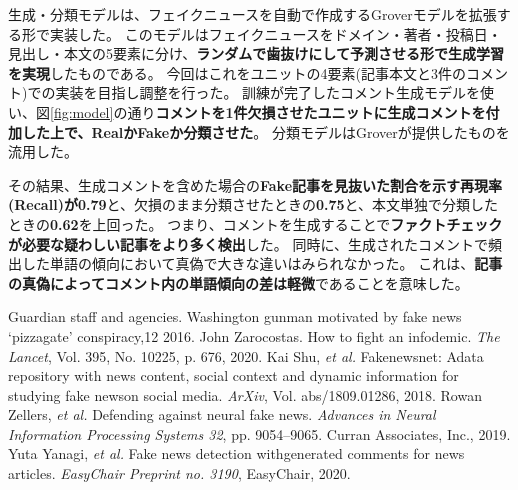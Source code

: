 {	生成・分類モデルは、フェイクニュースを自動で作成するGroverモデル\cite{NIPS2019_9106}を拡張する形で実装した。
	このモデルはフェイクニュースをドメイン・著者・投稿日・見出し・本文の5要素に分け、\textbf{ランダムで歯抜けにして予測させる形で生成学習を実現}したものである。
	今回はこれをユニットの4要素(記事本文と3件のコメント)での実装を目指し調整を行った。
	訓練が完了したコメント生成モデルを使い、図\ref{fig:model}の通り\textbf{コメントを1件欠損させたユニットに生成コメントを付加した上で、RealかFakeか分類させた}。
	分類モデルはGroverが提供したものを流用した。

	その結果、生成コメントを含めた場合の\textbf{Fake記事を見抜いた割合を示す再現率(Recall)が0.79}と、欠損のまま分類させたときの\textbf{0.75}と、本文単独で分類したときの\textbf{0.62}を上回った。
	つまり、コメントを生成することで\textbf{ファクトチェックが必要な疑わしい記事をより多く検出}した\cite{EasyChair:3190}。
	同時に、生成されたコメントで頻出した単語の傾向において真偽で大きな違いはみられなかった。
	これは、\textbf{記事の真偽によってコメント内の単語傾向の差は軽微}であることを意味した。

	{\small 
	\begin{thebibliography}{99}
		 Guardian staff and agencies. Washington gunman motivated by fake news `pizzagate' conspiracy,12 2016.
		 John Zarocostas. How to fight an infodemic. \textit{The Lancet}, Vol. 395, No. 10225, p. 676, 2020.
		 Kai Shu, \textit{et al.} Fakenewsnet: Adata repository with news content, social context and dynamic information for studying fake newson social media. \textit{ArXiv}, Vol. abs/1809.01286, 2018.
		 Rowan Zellers, \textit{et al.} Defending against neural fake news. \textit{Advances in Neural Information Processing Systems 32}, pp. 9054–9065. Curran Associates, Inc., 2019.
		 Yuta Yanagi, \textit{et al.} Fake news detection withgenerated comments for news articles. \textit{EasyChair Preprint no. 3190}, EasyChair, 2020.
	\end{thebibliography}
	}
}

